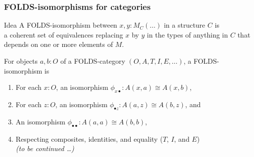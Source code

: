 \documentclass{beamer}
\begin{document}
\begin{frame}[t]
  \frametitle{FOLDS-isomorphisms for categories}
  \begin{block}{Idea}
    A FOLDS-isomorphism between $x,y:M_C(\dots)$ in a structure $C$ is\\\alert<1>{a coherent set of equivalences replacing $x$ by $y$ in the types of anything in $C$ that depends on one or more elements of $M$}.
  \end{block}
  \pause
  \begin{example}
  For objects $a,b:O$ of a FOLDS-category $(O,A,T,I,E,\dots)$, a FOLDS-isomorphism is
  \begin{enumerate}
  \item For each $x:O$, an isomorphism $\phi_{x\bullet} : A(x,a) \cong A(x,b)$,
  \item For each $z:O$, an isomorphism $\phi_{\bullet z} : A(a,z) \cong A(b,z)$, and
  \item An isomorphism $\phi_{\bullet\bullet} : A(a,a) \cong A(b,b)$,
  \item Respecting composites, identities, and equality ($T$, $I$, and $E$)\\
    \textit{(to be continued \dots)}
  \end{enumerate}
\end{example}
\end{frame}
\end{document}
